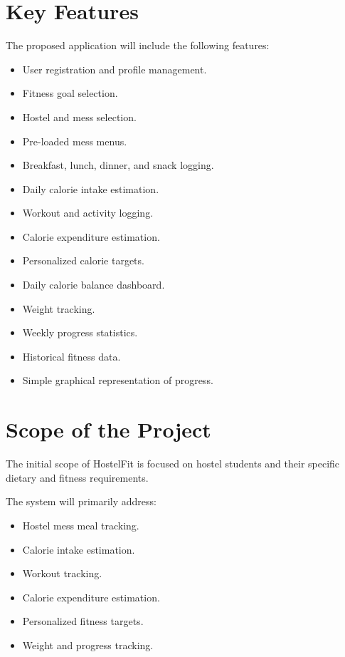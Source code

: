 \documentclass[11pt,a4paper]{article}
\begin{document}
\section{Key Features}

The proposed application will include the following features:
\begin{itemize}
    \item User registration and profile management.
    \item Fitness goal selection.
    \item Hostel and mess selection.
    \item Pre-loaded mess menus.
    \item Breakfast, lunch, dinner, and snack logging.
    \item Daily calorie intake estimation.
    \item Workout and activity logging.
    \item Calorie expenditure estimation.
    \item Personalized calorie targets.
    \item Daily calorie balance dashboard.
    \item Weight tracking.
    \item Weekly progress statistics.
    \item Historical fitness data.
    \item Simple graphical representation of progress.
\end{itemize}

\section{Scope of the Project}

The initial scope of HostelFit is focused on hostel students and their specific dietary and fitness requirements.

The system will primarily address:
\begin{itemize}
    \item Hostel mess meal tracking.
    \item Calorie intake estimation.
    \item Workout tracking.
    \item Calorie expenditure estimation.
    \item Personalized fitness targets.
    \item Weight and progress tracking.
\end{itemize}
\end{document}

